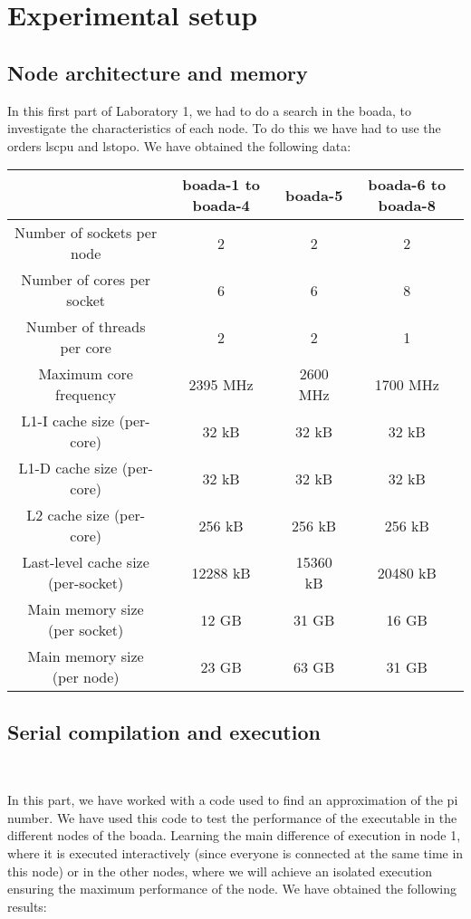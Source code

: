 \documentclass[12pt, a4paper]{article}
\begin{document}
\newpage
\section{Experimental setup}
\subsection{Node architecture and memory}

In this first part of Laboratory 1, we had to do a search in the boada, to investigate the characteristics of each node. To do this we have had to use the orders lscpu and lstopo. We have obtained the following data:

\begin{center}
	\begin{tabular}{|c || c | c | c|} 
	\hline
	  & boada-1 \textbf{to} boada-4 & boada-5 & boada-6 \textbf{to} boada-8 \\
	\hline
	Number of sockets per node & 2 & 2 & 2 \\ 
	\hline
	Number of cores per socket & 6 & 6 & 8 \\
	\hline
	Number of threads per core & 2 & 2 & 1 \\
	\hline
	Maximum core frequency & 2395 MHz & 2600 MHz & 1700 MHz \\
	\hline \hline
	L1-I cache size (per-core) & 32 kB & 32 kB & 32 kB \\ 
	\hline
	L1-D cache size (per-core) & 32 kB & 32 kB & 32 kB \\
	\hline
	L2 cache size (per-core) & 256 kB & 256 kB & 256 kB \\
	\hline
	Last-level cache size (per-socket) & 12288 kB & 15360 kB & 20480 kB \\
	\hline \hline
	Main memory size (per socket) & 12 GB & 31 GB & 16 GB \\
	\hline
	Main memory size (per node) & 23 GB & 63 GB & 31 GB \\
	\hline
   \end{tabular}
\end{center}

\subsection{Serial compilation and execution}

\ \newline

In this part, we have worked with a code used to find an approximation of the pi number.
We have used this code to test the performance of the executable in the different nodes of the boada. Learning the main difference of execution in node 1, where it is executed interactively (since everyone is connected at the same time in this node) or in the other nodes, where we will achieve an isolated execution ensuring the maximum performance of the node.
We have obtained the following results:\newline
\end{document}
